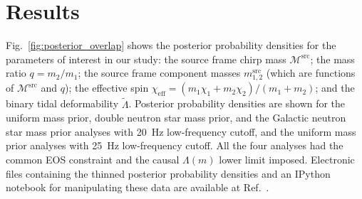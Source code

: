 \section{Results}


Fig.~\ref{fig:posterior_overlap} shows the posterior probability densities for the parameters of interest in our study: the source frame chirp mass $\mathcal{M}^\mathrm{src}$; the mass ratio $q=m_2/m_1$; the source frame component masses $m_{1,2}^\mathrm{src}$ (which are functions of $\mathcal{M}^\mathrm{src}$ and $q$); the effective spin $\chi_\mathrm{eff} = (m_1 \chi_1 + m_2 \chi_2) / (m_1 + m_2)$; and the binary tidal deformability $\tilde{\Lambda}$. Posterior probability densities are shown for the uniform mass prior, double neutron star mass prior, and the Galactic neutron star mass prior analyses with 20~Hz low-frequency cutoff, and the uniform mass prior analyses with 25~Hz low-frequency cutoff. All the four analyses had the common EOS constraint and the causal $\Lambda(m)$ lower limit imposed. Electronic files containing the thinned posterior probability densities and an IPython notebook \cite{PER-GRA:2007} for manipulating these data are available at Ref.~\cite{gw170817commoneos}.


